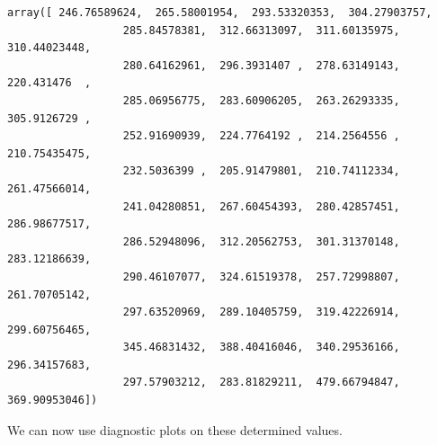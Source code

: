 \documentclass[10pt]{article}\usepackage[]{graphicx}\usepackage[]{xcolor}
\begin{document}
            \begin{Verbatim}[commandchars=\\\{\}]
 array([ 246.76589624,  265.58001954,  293.53320353,  304.27903757,
                  285.84578381,  312.66313097,  311.60135975,  310.44023448,
                  280.64162961,  296.3931407 ,  278.63149143,  220.431476  ,
                  285.06956775,  283.60906205,  263.26293335,  305.9126729 ,
                  252.91690939,  224.7764192 ,  214.2564556 ,  210.75435475,
                  232.5036399 ,  205.91479801,  210.74112334,  261.47566014,
                  241.04280851,  267.60454393,  280.42857451,  286.98677517,
                  286.52948096,  312.20562753,  301.31370148,  283.12186639,
                  290.46107077,  324.61519378,  257.72998807,  261.70705142,
                  297.63520969,  289.10405759,  319.42226914,  299.60756465,
                  345.46831432,  388.40416046,  340.29536166,  296.34157683,
                  297.57903212,  283.81829211,  479.66794847,  369.90953046])
\end{Verbatim}
        
    We can now use diagnostic plots on these determined values.
\end{document}
